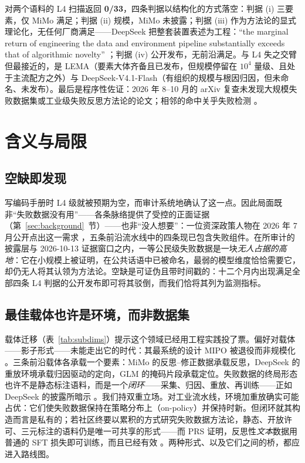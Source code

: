 \documentclass[10pt,fontset=fandol]{ctexart}
\begin{document}
对两个语料的 L4 扫描返回 \textbf{0/33}，四条判据以结构化的方式落空：判据 (i) 三要素，仅 MiMo 满足；判据 (ii) 规模，MiMo 未披露；判据 (iii) 作为方法论的显式理论化，无任何厂商满足——DeepSeek 把整套装置表述为工程：``the marginal return of engineering the data and environment pipeline substantially exceeds that of algorithmic novelty'' \cite{deepseek2026v41}；判据 (iv) 公开发布，无前沿满足。与 L4 失之交臂但最接近的，是 LEMA（要素大体齐备且已发布，但规模停留在 $10^4$ 量级、且处于主流配方之外）与 DeepSeek-V4.1-Flash（有组织的规模与根因归因，但未命名、未发布）。最后是程序性佐证：2026 年 8--10 月的 arXiv 复查未发现大规模失败数据集或工业级失败反思方法论的论文；相邻的命中关乎失败检测 \cite{zhang2026foresight}。

\section{含义与局限}\label{sec:discussion}

\subsection{空缺即发现}

写编码手册时 L4 级就被预期为空，而审计系统地确认了这一点。因此局面既非“失败数据没有用”——各条脉络提供了受控的正面证据（第~\ref{sec:background}~节）——也非“没人想要”：一位资深政策人物在 2026 年 7 月公开点出这一需求 \cite{waic2026}，五条前沿流水线中的四条现已包含失败组件。在所审计的披露层与 2026-10-13 证据窗口之内，一等公民级失败数据是一块\emph{无人占据的高地}：它在小规模上被证明，在公共话语中已被命名，最弱的模型维度恰恰需要它，却仍无人将其认领为方法论。空缺是可证伪且带时间戳的：十二个月内出现满足全部四条 L4 判据的公开发布即可将其驳倒，而我们恰将其列为监测指标。

\subsection{最佳载体也许是环境，而非数据集}

载体迁移（表~\ref{tab:subdims}）提示这个领域已经用工程实践投了票。偏好对载体——影子形式——未能走出它的时代：其最系统的设计 MIPO 被退役而非规模化 \cite{zai2025glm45}。三条前沿载体各承载一个要素：MiMo 的反思--修正数据承载反思，DeepSeek 的重放环境承载归因驱动的定向，GLM 的掩码片段承载定位。失败数据的终局形态也许不是静态标注语料，而是一个\emph{闭环}——采集、归因、重放、再训练——正如 DeepSeek 的披露所暗示 \cite{deepseek2026v41}。我们持双重立场。对工业流水线，环境加重放确实可能占优：它们使失败数据保持在策略分布上（on-policy）并保持时新。但闭环就其构造而言是私有的；若社区终要以累积的方式研究失败数据方法论，静态、开放许可、三元标注的语料仍是唯一可共享的形式——而 PRS 证明，反思性\emph{文本}数据用普通的 SFT 损失即可训练，而且已经有效 \cite{hao2026prs}。两种形式、以及它们之间的桥，都应进入路线图。
\end{document}
